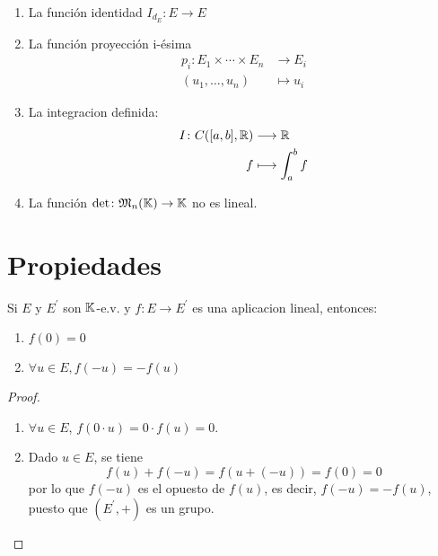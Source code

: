 \begin{example}
	\begin{enumerate}
		\item La función identidad \(I_{d_E} \colon E \to E \)
		\item La función proyección i-ésima
		      \[
			      \begin{aligned}
				      p_i \colon E_1 \times \cdots \times E_n & \longrightarrow E_i \\
				      (u_1, \ldots, u_n )                     & \longmapsto u_i
			      \end{aligned}
		      \]
		\item La integracion definida: \[
			\begin{aligned}
				I \colon C([a,b], \mathbb{R} ) & \longrightarrow \mathbb{R}       \\
				f           & \longmapsto \int^{b}_a f 
			\end{aligned}
		\]
		\item La función \(\det \colon \mathfrak{\MakeUppercase{m}}_n (\K ) \to \K \) no es lineal.  

	\end{enumerate}
\end{example}
\section{Propiedades}
\begin{proposition}
	Si \(E \) y \(E^\prime  \) son \(\mathbb{K} \)-e.v. y \(f : E \to E^\prime \) es una aplicacion lineal, entonces:
	\begin{enumerate}
		\item \(f(0) = 0 \)
		\item \(\forall u \in E, f(-u) = -f(u)\)
	\end{enumerate}
\end{proposition}
\begin{proof}
	\begin{enumerate}
		\item \(\forall u \in E \), \(f(0 \cdot u) = 0 \cdot f(u) = 0\).
		\item Dado \(u \in E \), se tiene
		      \[
			      f(u) + f(-u) = f (u + (-u)) = f(0) = 0
		      \]
		      por lo que \(f(-u )\) es el opuesto de \(f(u )\), es decir, \(f(-u) = -f(u )\), puesto que \((E^\prime, + )\) es un grupo.
	\end{enumerate}
\end{proof}

